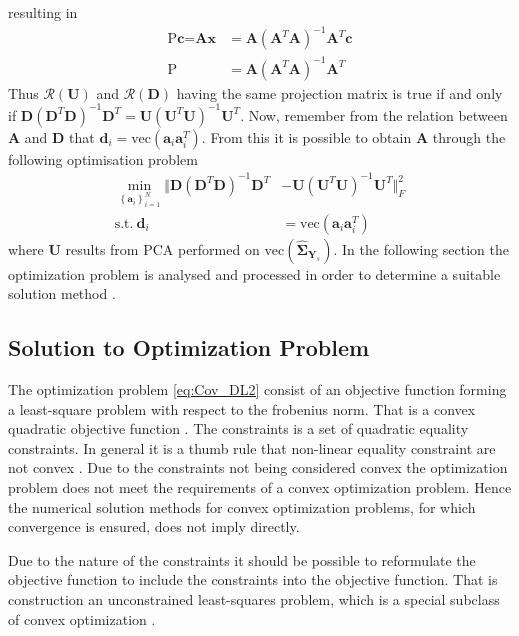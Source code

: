 resulting in
\begin{align*}
\text{P}\textbf{c} = \textbf{Ax} &= \textbf{A}(\textbf{A}^T\textbf{A})^{-1}\textbf{A}^T\textbf{c}\\
\text{P} &= \textbf{A}(\textbf{A}^T\textbf{A})^{-1}\textbf{A}^T 
\end{align*} 
Thus $\mathcal{R}(\textbf{U})$ and $\mathcal{R}(\textbf{D})$ having the same projection matrix is true if and only if $\textbf{D}(\textbf{D}^T\textbf{D})^{-1}\textbf{D}^T=\textbf{U}(\textbf{U}^T\textbf{U})^{-1}\textbf{U}^T$. 
Now, remember from the relation between $\textbf{A}$ and $\textbf{D}$ that $\textbf{d}_i = \text{vec}(\textbf{a}_i\textbf{a}_i^T)$. 
From this it is possible to obtain $\textbf{A}$ through the following optimisation problem 
\begin{align}
\min_{\left\{\textbf{a}_i\right\}_{i = 1}^{N}}\Vert  \textbf{D}(\textbf{D}^T\textbf{D})^{-1}\textbf{D}^T &- \textbf{U}(\textbf{U}^T\textbf{U})^{-1}\textbf{U}^T \Vert_{F}^{2} \nonumber \\
\text{s.t.} \ \textbf{d}_i&=\text{vec}(\textbf{a}_i\textbf{a}_i^T)\label{eq:Cov_DL2}
\end{align}      
where $\textbf{U}$ results from PCA performed on $\text{vec}(\widehat{\boldsymbol{\Sigma}}_{\textbf{Y}_s})$.
In the following section the optimization problem is analysed and processed in order to determine a suitable solution method . 

\subsection{Solution to Optimization Problem}
The optimization problem \eqref{eq:Cov_DL2} consist of an objective function forming a least-square problem with respect to the frobenius norm.
That is a convex quadratic objective function .
The constraints is a set of quadratic equality constraints. In general it is a thumb rule that non-linear equality constraint are not convex .
Due to the constraints not being considered convex the optimization problem does not meet the requirements of a convex optimization problem. Hence the numerical solution methods for convex optimization problems, for which convergence is ensured, does not imply directly. 

Due to the nature of the constraints it should be possible to reformulate the objective function to include the constraints into the objective function. That is construction an unconstrained least-squares problem, which is a special subclass of convex optimization \cite{cvxbook}.

